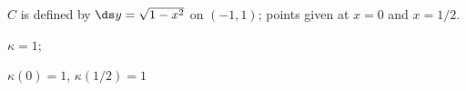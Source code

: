 {$C$ is defined by $\ds y = \sqrt{1-x^2}$ on $(-1,1)$; points given at $x=0$ and $x=1/2$. 
}
{$\kappa = 1$;

$\kappa(0) = 1$, $\kappa(1/2) = 1$
}